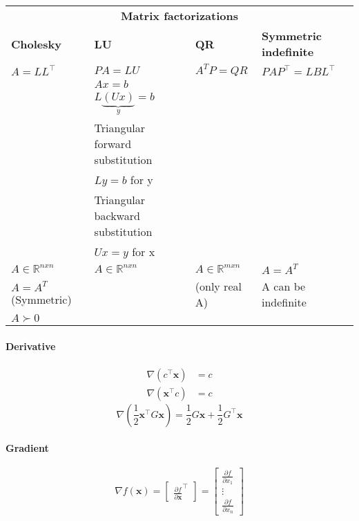 
\hskip-0.5cm
\begin{tabularx}{\linewidth}{X X X X}
	\multicolumn{4}{c}{\textbf{Matrix factorizations}} \\
	\textbf{Cholesky} & \textbf{LU} & \textbf{QR} & \textbf{Symmetric indefinite}\\
	\hline
	$A = LL^\top$ & $PA = LU$ & $A^T P = QR$ & $PAP^\top = LBL^\top$\\ %
	\hline
	& $Ax = b$ & &\\
	& $L\underbrace{(Ux)}_{y} = b$ & &\\
	& Triangular forward substitution & &\\
	& $Ly = b$ for y & &\\
	& Triangular backward substitution & &\\
	& $Ux = y$ for x & &\\
	\hline
	$A \in \mathbb{R}^{nxn}$ & $A \in \mathbb{R}^{nxn}$ & $A \in \mathbb{R}^{mxn}$ & $A=A^T$\\
	$A=A^T$ (Symmetric) & & (only real A) & A can be indefinite\\
	$A \succ 0$ & & & \\
\end{tabularx}


\paragraph{Derivative}
\begin{equation}
\begin{split}
  \nabla(c^\top \mathbf{x}) &= c\\
  \nabla(\mathbf{x}^\top c) &= c
\end{split}
\end{equation}
%
\begin{equation}
  \nabla \left( \frac{1}{2} \mathbf{x}^\top G \mathbf{x} \right) = \frac{1}{2}G \mathbf{x} + \frac{1}{2}G^\top \mathbf{x}
\end{equation}

\paragraph{Gradient}
\begin{equation}
  \nabla f(\mathbf{x}) = \begin{bmatrix} \frac{\partial f}{\partial \mathbf{x}}^\top \end{bmatrix}
  = \begin{bmatrix}
  \frac{\partial f}{\partial x_1}\\
  \vdots\\
  \frac{\partial f}{\partial x_n}
  \end{bmatrix}
\end{equation}

